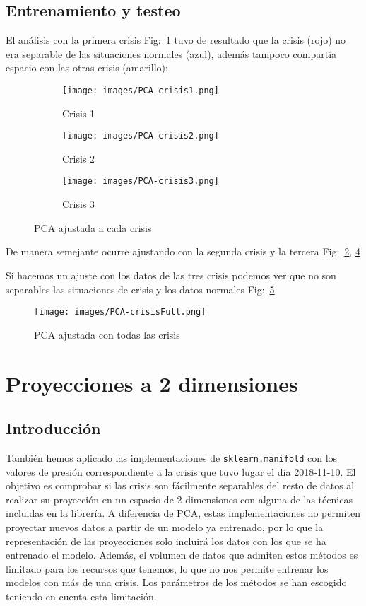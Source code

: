 \documentclass[a4paper,12pt,twoside,oldfontcommands]{memoir}
\begin{document}
\section{Entrenamiento y testeo}
El análisis con la primera crisis Fig:~\ref{fig:pca_crisis1} tuvo de resultado que la crisis (rojo) no era separable de las situaciones normales (azul), además tampoco compartía espacio con las otras crisis (amarillo):

\begin{figure}
    \centering
    \begin{subfigure}[b]{0.45\textwidth}
        \texttt{[image: images/PCA-crisis1.png]}
        \caption{Crisis 1}
        \label{fig:pca_crisis1}
    \end{subfigure}
    \begin{subfigure}[b]{0.45\textwidth}
        \texttt{[image: images/PCA-crisis2.png]}
        \caption{Crisis 2}
        \label{fig:pca_crisis2}
    \end{subfigure}
    \begin{subfigure}[b]{0.45\textwidth}
        \texttt{[image: images/PCA-crisis3.png]}
        \caption{Crisis 3}
        \label{fig:pca_crisis3}
    \end{subfigure}
    \caption{PCA ajustada a cada crisis}
\end{figure}

De manera semejante ocurre ajustando con la segunda crisis y la tercera Fig:~\ref{fig:pca_crisis2}, \ref{fig:pca_crisis3}

Si hacemos un ajuste con los datos de las tres crisis podemos ver que no son separables las situaciones de crisis y los datos normales Fig:~\ref{fig:pca_crisis_full}
\begin{figure}
    \centering
    \texttt{[image: images/PCA-crisisFull.png]}
    \caption{PCA ajustada con todas las crisis}
    \label{fig:pca_crisis_full}
\end{figure}
\chapter{Proyecciones a 2 dimensiones}
\section{Introducción}
También hemos aplicado las implementaciones de \texttt{sklearn.manifold} con los valores de presión correspondiente a la crisis que tuvo lugar el día 2018-11-10. El objetivo es comprobar si las crisis son fácilmente separables del resto de datos al realizar su proyección en un espacio de 2 dimensiones con alguna de las técnicas incluidas en la librería. A diferencia de PCA, estas implementaciones no permiten proyectar nuevos datos a partir de un modelo ya entrenado, por lo que la representación de las proyecciones solo incluirá los datos con los que se ha entrenado el modelo. Además, el volumen de datos que admiten estos métodos es limitado para los recursos que tenemos, lo que no nos permite entrenar los modelos con más de una crisis. Los parámetros de los métodos se han escogido teniendo en cuenta esta limitación. 
\end{document}
